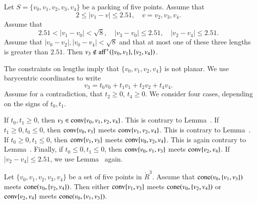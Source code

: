 \begin{tarskidata}
\begin{tarski}
\begin{lemma}
Let $S=\{v_0,v_1,v_2,v_3,v_4\}$ be a packing of five points.
Assume that
  $$2\le |v_1-v|\le 2.51,\quad v = v_2,v_3,v_4.$$
Assume that
  $$2.51 < |v_1-v_0| < \sqrt8,\quad |v_3-v_0|\le 2.51,
   \quad |v_2-v_4|\le2.51.$$
Assume that $|v_0-v_2|,|v_0-v_4|<\sqrt8$ and that
at most one of these three lengths is greater than $2.51$.
Then $v_3\not\in{\operatorname{aff}}^+(\{v_0,v_1\},\{v_2,v_4\})$.
\end{lemma}



\begin{proved}
The constraints on lengths imply that $\{v_0,v_1,v_2,v_4\}$
is not planar.  We use barycentric 
coordinates to write
  $$
  v_3 = t_0 v_0 + t_1 v_1 + t_2 v_2 + t_4 v_4.
  $$
Assume for a contradiction, that $t_2\ge0$, $t_4\ge0$.
We consider four cases, depending on the signs of $t_0,t_1$.

If $t_0,t_1\ge0$, then $v_3\in{\operatorname{conv}}\{v_0,v_1,v_2,v_4\}$.
This is contrary to Lemma~.
If $t_1\ge0,t_0\le0$, then ${\operatorname{conv}}\{v_0,v_3\}$ meets
${\operatorname{conv}}\{v_1,v_2,v_4\}$.  
This is contrary to Lemma~.
If $t_0\ge0,t_1\le0$, then ${\operatorname{conv}}\{v_1,v_3\}$ meets
${\operatorname{conv}}\{v_0,v_2,v_4\}$.  
This is again contrary to Lemma~.  Finally, if
$t_0\le0,t_1\le0$, then ${\operatorname{conv}}\{v_0,v_1,v_3\}$ meets 
${\operatorname{conv}}\{v_2,v_4\}$.  
If $|v_2-v_4|\le 2.51$, we use Lemma~ again.
\swallowed\end{proved}
\end{tarski}





\begin{tarski}

\begin{lemma}
Let $\{v_0,v_1,v_2,v_3,v_4\}$ be a set of five points in $\ring{R}^3$.
Assume that ${\operatorname{cone}}(v_0,\{v_1,v_3\})$ meets
  ${\operatorname{cone}}(v_0,\{v_2,v_4\})$.  Then either
${\operatorname{conv}}\{v_1,v_3\}$ meets ${\operatorname{cone}}(v_0,\{v_2,v_4\})$ or
${\operatorname{conv}}\{v_2,v_4\}$ meets ${\operatorname{cone}}(v_0,\{v_1,v_3\})$.
\end{lemma}


\end{tarski}
\end{tarskidata}
